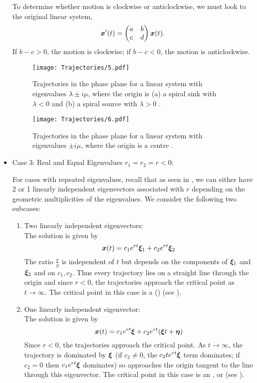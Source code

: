 \begin{itemize}
	To determine whether motion is clockwise or anticlockwise, we must look to the original linear system,
	\[
		\bm{x}'(t) = \begin{pmatrix}a & b \\ c & d\end{pmatrix}\bm{x}(t).
	\]
	If $b-c>0$, the motion is clockwise; if $b-c<0$, the motion is anticlockwise.
	
	\begin{figure}[h!]
		\centering
		\texttt{[image: Trajectories/5.pdf]}
		\caption{Trajectories in the phase plane for a linear system with eigenvalues $\lambda \pm i\mu$, where the origin is (a) a spiral sink with $\lambda <0$ and (b) a spiral source with $\lambda >0$ \cite[Figure 9.1.5]{boyce}.}
		\label{fig:trajectory5}
	\end{figure}
	
	\begin{figure}[h!]
		\centering
		\texttt{[image: Trajectories/6.pdf]}
		\caption{Trajectories in the phase plane for a linear system with eigenvalues $\pm i\mu$, where the origin is a centre \cite[Figure 9.1.6(a)]{boyce}.}
		\label{fig:trajectory6}
	\end{figure}
	
	\item Case 3: Real and Equal Eigenvalues $r_1 = r_2 = r < 0$:
	
	For cases with repeated eigenvalues, recall that as seen in , we can either have 2 or 1 linearly independent eigenvectors associated with $r$ depending on the geometric multiplicities of the eigenvalues. We consider the following two subcases:
	\begin{enumerate}[label=(\roman*)]
		\item Two linearly independent eigenvectors: \\ 
		The solution is given by 
		\[
		\bm{x}(t) = c_1 e^{rt} \bm{\xi}_1 + c_2 e^{rt} \bm{\xi}_2
		\]
		The ratio $\frac{x}{y}$ is independent of $t$ but depends on the components of $\bm{\xi}_1$ and $\bm{\xi}_2$ and on $c_1, c_2$. Thus every trajectory lies on a straight line through the origin and since $r<0$, the trajectories approach the critical point as $t \to \infty$. The critical point in this case is a  () (see ).
		
		\item One linearly independent eigenvector: \\
		The solution is given by 
		\[
		\bm{x}(t) = c_1 e^{rt} \bm{\xi} + c_2 e^{rt} (\bm{\xi} t + \bm{\eta})
		\]
		Since $r<0$, the trajectories approach the critical point. As $t \to \infty$, the trajectory is dominated by $\bm{\xi}$ (if $c_2 \neq 0$, the $c_2 te^{rt} \bm{\xi}$ term dominates; if $c_2 = 0$ then $c_1 e^{rt} \bm{\xi}$ dominates) so approaches the origin tangent to the line through this eigenvector. The critical point in this case is an , or  (see ).
		

\end{enumerate}
\end{itemize}
